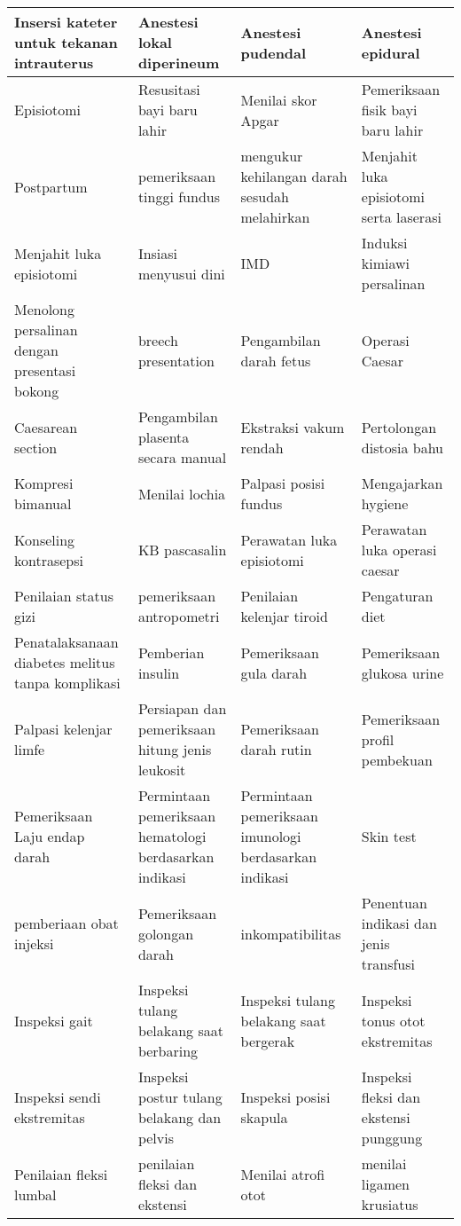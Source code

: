 {\begin{longtable}{|p{}|p{}|p{}|p{}|}
	Insersi kateter untuk tekanan intrauterus & Anestesi lokal diperineum & Anestesi pudendal & Anestesi epidural \\ \hline
	Episiotomi & Resusitasi bayi baru lahir & Menilai skor Apgar & Pemeriksaan fisik bayi baru lahir \\ \hline
	Postpartum & pemeriksaan tinggi fundus & mengukur kehilangan darah sesudah melahirkan & Menjahit luka episiotomi serta laserasi \\ \hline
	Menjahit luka episiotomi & Insiasi menyusui dini & IMD & Induksi kimiawi persalinan \\ \hline
	Menolong persalinan dengan presentasi bokong & breech presentation & Pengambilan darah fetus & Operasi Caesar \\ \hline
	Caesarean section & Pengambilan plasenta secara manual & Ekstraksi vakum rendah & Pertolongan distosia bahu \\ \hline
	Kompresi bimanual & Menilai lochia & Palpasi posisi fundus & Mengajarkan hygiene \\ \hline
	Konseling kontrasepsi & KB pascasalin & Perawatan luka episiotomi & Perawatan luka operasi caesar \\ \hline
	Penilaian status gizi & pemeriksaan antropometri & Penilaian kelenjar tiroid & Pengaturan diet \\ \hline
	Penatalaksanaan diabetes melitus tanpa komplikasi & Pemberian insulin & Pemeriksaan gula darah & Pemeriksaan glukosa urine \\ \hline
	Palpasi kelenjar limfe & Persiapan dan pemeriksaan hitung jenis leukosit & Pemeriksaan darah rutin & Pemeriksaan profil pembekuan \\ \hline
	Pemeriksaan Laju endap darah & Permintaan pemeriksaan hematologi berdasarkan indikasi & Permintaan pemeriksaan imunologi berdasarkan indikasi & Skin test \\ \hline
	pemberiaan obat injeksi & Pemeriksaan golongan darah & inkompatibilitas & Penentuan indikasi dan jenis transfusi \\ \hline
	Inspeksi gait & Inspeksi tulang belakang saat berbaring & Inspeksi tulang belakang saat bergerak & Inspeksi tonus otot ekstremitas \\ \hline
	Inspeksi sendi ekstremitas & Inspeksi postur tulang belakang dan pelvis & Inspeksi posisi skapula & Inspeksi fleksi dan ekstensi punggung \\ \hline
	Penilaian fleksi lumbal & penilaian fleksi dan ekstensi & Menilai atrofi otot & menilai ligamen krusiatus \\ \hline

\end{longtable}}
